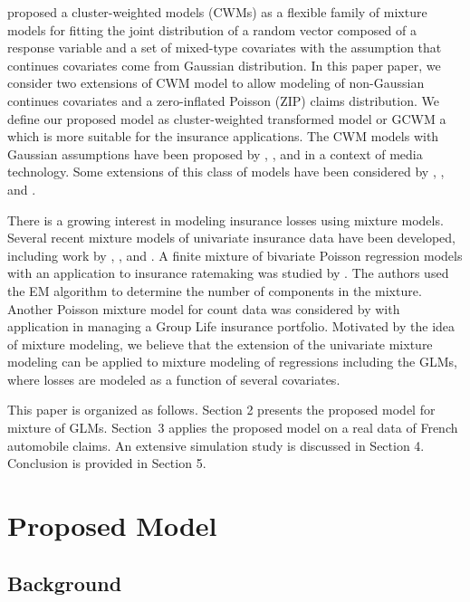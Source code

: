\documentclass[11pt,letterpaper]{article}
\numberwithin{equation}{section}
\numberwithin{equation}{section}
\numberwithin{equation}{section}
\begin{document}
\cite{Ingrassia+Punzo+Vittadini+Minotti:2015} proposed a cluster-weighted models (CWMs) as a flexible family of mixture models for fitting the joint distribution of a random vector composed of a response variable and a set of mixed-type covariates with the assumption that continues covariates come from Gaussian distribution. In this paper paper, we consider two extensions of CWM model to allow modeling of non-Gaussian continues covariates and a zero-inflated Poisson (ZIP) claims distribution. We define our proposed model as cluster-weighted transformed model or GCWM a which is more suitable for the insurance applications.
%
The CWM models with Gaussian assumptions have been proposed by \cite{Gershenfeld:1997}, \cite{Gershenfeld:Schoner+Metois:1999}, and \cite{Gershenfeld:1999} in a context of media technology. Some extensions of this class of models have been considered by \cite{Punzo+Ingrassia:2015}, \cite{Ingrassia+Minotti+Punzo:2014}, and \cite{Ingrassia+Minotti+Vittadini:2012}.

There is a growing interest in modeling insurance losses using mixture models. Several recent mixture models of univariate insurance data have been developed, including work by \cite{Lee+Lin:2010}, \cite{Verbelen+Gong+Antonio+Badescu+Lin:2015}, and \cite{Miljkovic+Grun:2016}. A finite mixture of bivariate Poisson regression models with an application to insurance ratemaking was studied by \cite{Bermudez+Karlis:2012}. The authors used the EM algorithm to determine the number of components in the mixture. Another Poisson mixture model for count data was considered by \cite{Brown+Buckley:2015} with application in managing a Group Life insurance portfolio. Motivated by the idea of mixture modeling, we believe that the extension of the univariate mixture modeling can be applied to mixture modeling of regressions including the GLMs, where losses are modeled as a function of several covariates.

This paper is organized as follows. Section 2 presents the proposed model for mixture of GLMs. Section~3 applies the proposed model on a real data of French automobile claims. An extensive simulation study is discussed in Section 4. Conclusion is provided in Section 5.


\section{Proposed Model}

\subsection{Background}
\end{document}

